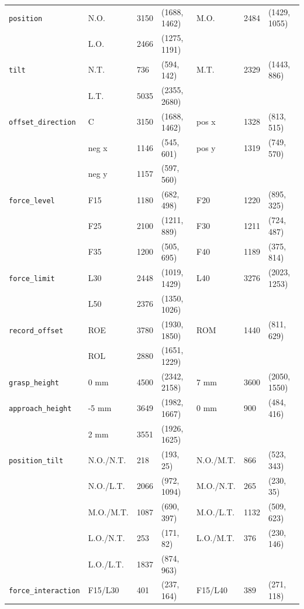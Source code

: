 \begin{table}[htbp]
\begin{tabular}{l lll lll}
        \texttt{position} & N.O. & 3150 & (1688, 1462) & M.O. & 2484 & (1429, 1055) \\
        & L.O. & 2466 & (1275, 1191) \\
        \midrule
        \texttt{tilt} & N.T. & 736 & (594, 142) & M.T. & 2329 & (1443, 886) \\
        & L.T. & 5035 & (2355, 2680) \\
        \midrule
        \texttt{offset\_direction} & C & 3150 & (1688, 1462) & pos x & 1328 & (813, 515) \\
        & neg x & 1146 & (545, 601) & pos y & 1319 & (749, 570) \\
        & neg y & 1157 & (597, 560) \\
        \midrule
        \texttt{force\_level} & F15 & 1180 & (682, 498) & F20 & 1220 & (895, 325) \\
        & F25 & 2100 & (1211, 889)  & F30 & 1211& (724, 487) \\
        & F35 & 1200 & (505, 695) & F40 & 1189 & (375, 814) \\
        \midrule
        \texttt{force\_limit} & L30 & 2448 & (1019, 1429) & L40 & 3276 & (2023, 1253) \\
        & L50 & 2376 & (1350, 1026) \\
        \midrule
        \texttt{record\_offset} & ROE & 3780 & (1930, 1850) & ROM & 1440 & (811, 629) \\
        & ROL & 2880 & (1651, 1229) \\
        \midrule
        \texttt{grasp\_height} & 0 mm & 4500 & (2342, 2158) & 7 mm & 3600 & (2050, 1550) \\
        \midrule
        \texttt{approach\_height} & -5 mm & 3649 & (1982, 1667) & 0 mm & 900 & (484, 416) \\
        & 2 mm & 3551 & (1926, 1625) \\
        \midrule
        \texttt{position\_tilt} & N.O./N.T. & 218 & (193, 25) & N.O./M.T. & 866 & (523, 343) \\
        & N.O./L.T. & 2066 & (972, 1094) & M.O./N.T. & 265 & (230, 35) \\
        & M.O./M.T. & 1087 & (690, 397) & M.O./L.T. & 1132 & (509, 623) \\
        & L.O./N.T. & 253 & (171, 82) & L.O./M.T. & 376 & (230, 146) \\
        & L.O./L.T. & 1837 & (874, 963) \\
        \midrule
        \texttt{force\_interaction} & F15/L30 & 401 & (237, 164) & F15/L40 & 389 & (271, 118) \\

\end{tabular}
\end{table}
